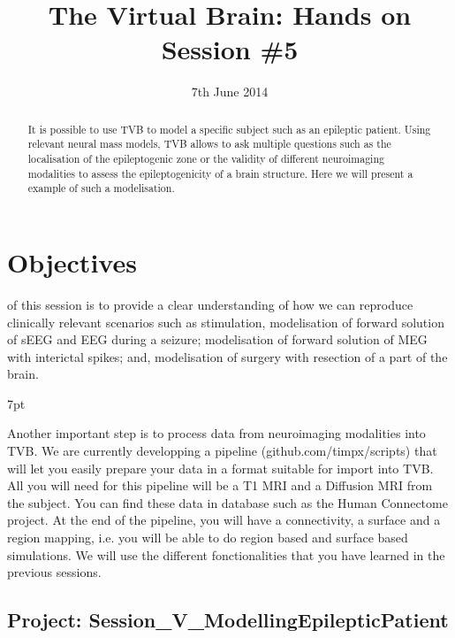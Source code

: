 \documentclass{tufte-handout}
\title{The Virtual Brain: Hands on Session \#5}
\date{7th June 2014}
\newenvironment{blah}{%
  \def\FrameCommand{%
    \hspace{1pt}%
    {\color{DarkOrange}\vrule width 2pt}%
    {\color{PeachPuff}\vrule width 4pt}%
    \colorbox{PeachPuff}%
  }%
  \MakeFramed{\advance\hsize-\width\FrameRestore}%
  \noindent\hspace{-4.55pt}%
  \begin{adjustwidth}{}{7pt}%
  \vspace{2pt}\vspace{2pt}%
}
{%
  \vspace{2pt}\end{adjustwidth}\endMakeFramed%
}
\begin{document}

\newpage
\ClearWallPaper


\begin{abstract}
\noindent It is possible to use TVB to model a specific subject such as an epileptic patient. Using relevant neural
mass models, TVB allows to ask multiple questions such as the localisation of the epileptogenic zone or the validity
of different neuroimaging modalities to assess the epileptogenicity of a brain structure. Here we will present a example of
such a modelisation.
\end{abstract}


 

\section{Objectives}\label{sec:objectives}
 of this session is to provide a clear understanding of how we can reproduce clinically
relevant scenarios such as stimulation, modelisation of forward solution of sEEG and EEG during a seizure; modelisation of
forward solution of MEG  with interictal spikes; and, modelisation of surgery with resection of a part of the brain.

\begin{blah}
Another important step is to process data from neuroimaging modalities into TVB. We are currently developping a pipeline (github.com/timpx/scripts) that will let you easily prepare your data in a format suitable for import
into TVB. All you will need for this pipeline will be a T1 MRI and a Diffusion MRI from the subject. You can find these data
in database such as the Human Connectome project. At the end of the pipeline, you will have a connectivity, a surface and a region mapping,
i.e. you will be able to do region based and surface based simulations.
We will use the different fonctionalities that you have learned in the previous sessions.
\end{blah}

\subsection{Project: Session\_V\_ModellingEpilepticPatient }\label{sec:project_data}
\end{document}
